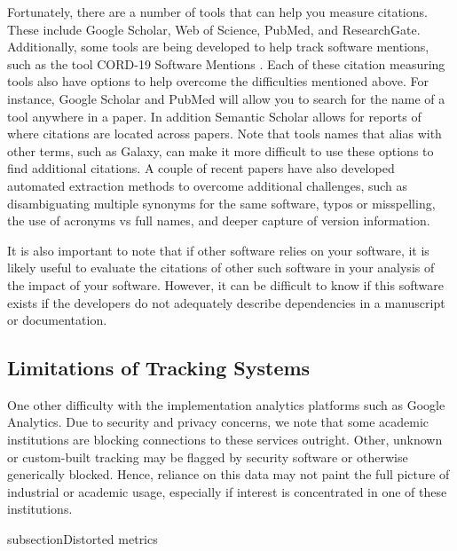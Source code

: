 \documentclass{article}
\begin{document}
Fortunately, there are a number of tools that can help you measure citations. These include Google Scholar, Web of Science, PubMed, and ResearchGate. Additionally, some tools are being developed to help track software mentions, such as the tool CORD-19 Software Mentions \cite{wade_cord-19_2021}. Each of these citation measuring tools also have options to help overcome the difficulties mentioned above. For instance, Google Scholar and PubMed will allow you to search for the name of a tool anywhere in a paper. In addition Semantic Scholar allows for reports of where citations are located across papers. Note that tools names that alias with other terms, such as Galaxy, can make it more difficult to use these options to find additional citations. A couple of recent papers \cite{istrate_large_2022, schindler_role_2022} have also developed automated extraction methods to overcome additional challenges, such as disambiguating multiple synonyms for the same software, typos or misspelling, the use of acronyms vs full names, and deeper capture of version information. 

It is also important to note that if other software relies on your software, it is likely useful to evaluate the citations of other such software in your analysis of the impact of your software. However, it can be difficult to know if this software exists if the developers do not adequately describe dependencies in a manuscript or documentation.

\subsection{Limitations of Tracking Systems}
One other difficulty with the implementation analytics platforms such as Google Analytics. Due to security and privacy concerns, we note that some academic institutions are blocking connections to these services outright. Other, unknown or custom-built tracking may be flagged by security software or otherwise generically blocked. Hence, reliance on this data may not paint the full picture of industrial or academic usage, especially if interest is concentrated in one of these institutions.

subsection{Distorted metrics}
\end{document}
